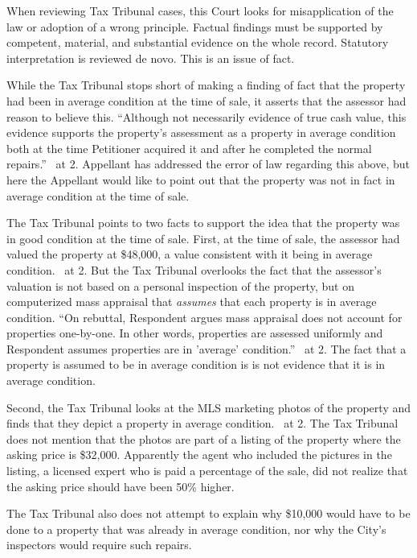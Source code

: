\documentclass[12pt,\documentclassflag]{michiganCourtOfAppealsBrief}
\begin{document}
When reviewing Tax Tribunal cases, this Court looks for misapplication of the law or adoption of a wrong principle. Factual findings must be supported by competent, material, and substantial evidence on the whole record. Statutory interpretation is reviewed de novo.  This is an issue of fact. 

While the Tax Tribunal stops short of making a finding of fact that the property had been in average condition at the time of sale, it asserts that the assessor had reason to believe this. ``Although not necessarily evidence of true cash value, this evidence supports the property's assessment as a property in average condition both at the time Petitioner acquired it and after he completed the normal repairs.'' \orderDenying\ at 2. Appellant has addressed the error of law regarding this above, but here the Appellant would like to point out that the property was not in fact in average condition at the time of sale. 

The Tax Tribunal points to two facts to support the idea that the property was in good condition at the time of sale. First, at the time of sale, the assessor had valued the property at \$48,000, a value consistent with it being in average condition. \orderDenying\ at 2. But the Tax Tribunal overlooks the fact that the assessor's valuation is not based on a personal inspection of the property, but on computerized mass appraisal that \textit{assumes} that each property is in average condition. ``On rebuttal, Respondent argues mass appraisal does not account for properties one-by-one. In other words, properties are assessed uniformly and Respondent assumes properties are in 'average' condition.'' \FOJ\ at 2. The fact that a property is assumed to be in average condition is is not evidence that it is in average condition.

Second, the Tax Tribunal looks at the MLS marketing photos of the property and finds that they depict a property in average condition. \orderDenying\ at 2. The Tax Tribunal does not mention that the photos are part of a listing of the property where the asking price is \$32,000. Apparently the agent who included the pictures in the listing, a licensed expert who is paid a percentage of the sale, did not realize that the asking price should have been 50\% higher.

The Tax Tribunal also does not attempt to explain why \$10,000 would have to be done to a property that was already in average condition, nor why the City's inspectors would require such repairs.
\end{document}
